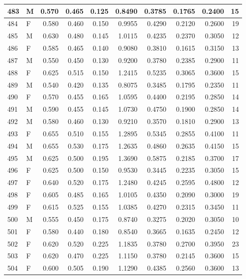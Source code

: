 \documentclass[9pt,twocolumn,twoside,]{pnas-new}
\begin{document}
\begin{tabular}{l|l|r|r|r|r|r|r|r|r}
\hline
483 & M & 0.570 & 0.465 & 0.125 & 0.8490 & 0.3785 & 0.1765 & 0.2400 & 15\\
\hline
484 & F & 0.580 & 0.460 & 0.150 & 0.9955 & 0.4290 & 0.2120 & 0.2600 & 19\\
\hline
485 & M & 0.630 & 0.480 & 0.145 & 1.0115 & 0.4235 & 0.2370 & 0.3050 & 12\\
\hline
486 & F & 0.585 & 0.465 & 0.140 & 0.9080 & 0.3810 & 0.1615 & 0.3150 & 13\\
\hline
487 & M & 0.550 & 0.450 & 0.130 & 0.9200 & 0.3780 & 0.2385 & 0.2900 & 11\\
\hline
488 & F & 0.625 & 0.515 & 0.150 & 1.2415 & 0.5235 & 0.3065 & 0.3600 & 15\\
\hline
489 & M & 0.540 & 0.420 & 0.135 & 0.8075 & 0.3485 & 0.1795 & 0.2350 & 11\\
\hline
490 & F & 0.570 & 0.455 & 0.165 & 1.0595 & 0.4400 & 0.2195 & 0.2850 & 14\\
\hline
491 & M & 0.590 & 0.455 & 0.145 & 1.0730 & 0.4750 & 0.1900 & 0.2850 & 14\\
\hline
492 & M & 0.580 & 0.460 & 0.130 & 0.9210 & 0.3570 & 0.1810 & 0.2900 & 13\\
\hline
493 & F & 0.655 & 0.510 & 0.155 & 1.2895 & 0.5345 & 0.2855 & 0.4100 & 11\\
\hline
494 & M & 0.655 & 0.530 & 0.175 & 1.2635 & 0.4860 & 0.2635 & 0.4150 & 15\\
\hline
495 & M & 0.625 & 0.500 & 0.195 & 1.3690 & 0.5875 & 0.2185 & 0.3700 & 17\\
\hline
496 & F & 0.625 & 0.500 & 0.150 & 0.9530 & 0.3445 & 0.2235 & 0.3050 & 15\\
\hline
497 & F & 0.640 & 0.520 & 0.175 & 1.2480 & 0.4245 & 0.2595 & 0.4800 & 12\\
\hline
498 & F & 0.605 & 0.485 & 0.165 & 1.0105 & 0.4350 & 0.2090 & 0.3000 & 19\\
\hline
499 & F & 0.615 & 0.525 & 0.155 & 1.0385 & 0.4270 & 0.2315 & 0.3450 & 11\\
\hline
500 & M & 0.555 & 0.450 & 0.175 & 0.8740 & 0.3275 & 0.2020 & 0.3050 & 10\\
\hline
501 & F & 0.580 & 0.440 & 0.180 & 0.8540 & 0.3665 & 0.1635 & 0.2450 & 12\\
\hline
502 & F & 0.620 & 0.520 & 0.225 & 1.1835 & 0.3780 & 0.2700 & 0.3950 & 23\\
\hline
503 & F & 0.620 & 0.470 & 0.225 & 1.1150 & 0.3780 & 0.2145 & 0.3600 & 15\\
\hline
504 & F & 0.600 & 0.505 & 0.190 & 1.1290 & 0.4385 & 0.2560 & 0.3600 & 13\\

\end{tabular}
\end{document}
